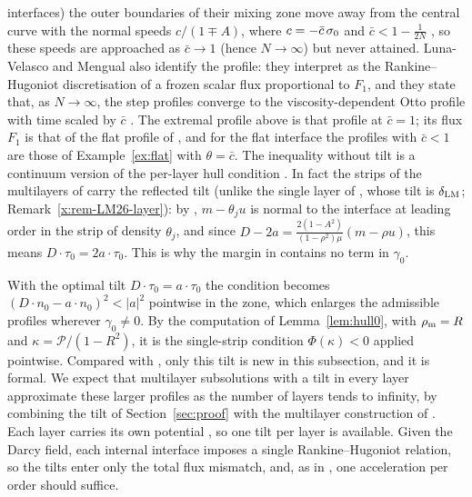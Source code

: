 interfaces) the outer boundaries of their mixing zone move away from the central curve with the normal speeds $c/(1\mp A)$, where $c=-\bar c\,\sigma_0$ and $\bar c<1-\frac1{2N}$
\cite[(7.13)--(7.15)]{LM26}, so these speeds are approached as $\bar c\to1$ (hence $N\to\infty$) but never attained. Luna-Velasco and Mengual also identify the profile: they interpret
\cite[(7.15)]{LM26} as the Rankine--Hugoniot discretisation of a frozen scalar flux proportional to $F_1$, and they state that, as $N\to\infty$, the step profiles converge to the
viscosity-dependent Otto profile with time scaled by $\bar c$ \cite[end of Sec.~7.5]{LM26}. The extremal profile above is that profile at $\bar c=1$; its flux $F_1$ is that of the flat profile
of \cite[Sec.~2]{Men22}, and for the flat interface the profiles with $\bar c<1$ are those of Example~\ref{ex:flat} with $\theta=\bar c$. The inequality without tilt is a continuum version of the
per-layer hull condition \cite[(7.18)--(7.19)]{LM26}. In fact the strips of the multilayers of \cite[Sec.~7.5]{LM26} carry the reflected tilt (unlike the
single layer of \cite[Secs.~4--7.4]{LM26}, whose tilt is $\delta_{\rm LM}$; Remark~\ref{x:rem-LM26-layer}): by \cite[(7.18)]{LM26}, $m-\theta_ju$ is normal to the interface at leading order
in the strip of density $\theta_j$, and since $D-2a=\frac{2(1-A^2)}{(1-\rho^2)\mu}(m-\rho u)$, this means $D\cdot\tau_0=2a\cdot\tau_0$. This is why the margin in \cite[(7.19)]{LM26} contains no
term in $\gamma_0$.

With the optimal tilt $D\cdot\tau_0=a\cdot\tau_0$ the condition becomes $(D\cdot n_0-a\cdot n_0)^2<|a|^2$ pointwise in the zone, which enlarges the admissible profiles wherever $\gamma_0\ne0$. By
the computation of Lemma~\ref{lem:hull0}, with $\rho_{\mathrm m}=R$ and $\kappa=\mathcal P/(1-R^2)$, it is the single-strip condition $\Phi(\kappa)<0$ applied pointwise. Compared with \cite{LM26}, only this
tilt is new in this subsection, and it is formal. We expect that multilayer subsolutions with a tilt in every layer approximate these larger profiles as the number of layers tends to infinity, by
combining the tilt of Section~\ref{sec:proof} with the multilayer construction of \cite[Sec.~7.5 and Lemma~8.8]{LM26}. Each layer carries its own potential \cite[(7.17) and (8.38)]{LM26}, so one
tilt per layer is available. Given the Darcy field, each internal interface imposes a single Rankine--Hugoniot relation, so the tilts enter only the total flux mismatch, and, as in
\cite[Lemma~8.8]{LM26}, one acceleration per order should suffice.

